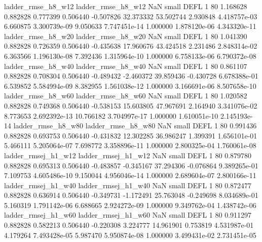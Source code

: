       ladder_rmse_h8_w12       ladder_rmse_h8_w12                   NaN      small     DEFL                 1 80 1.168628       0.882828 0.777399       0.506440   -0.507826     32.373332     53.502744     2.930848   4.418757e-03  6.660875 3.300739e-09     9.050633   7.747451e-14            1.000000    1.878120e-06        4.343320e-11
      ladder_rmse_h8_w20       ladder_rmse_h8_w20                   NaN      small     DEFL                 1 80 1.041390       0.882828 0.726359       0.506440   -0.435638     17.960676     43.424518     2.231486   2.848314e-02  6.363566 1.196130e-08     7.392436   1.315964e-10            1.000000    6.758133e-06        6.790372e-08
      ladder_rmse_h8_w40       ladder_rmse_h8_w40                   NaN      small     DEFL                 1 80 0.861107       0.882828 0.708304       0.506440   -0.489432     -2.460372     39.859436    -0.430728   6.678388e-01  6.539852 5.584994e-09     8.382955   1.561038e-12            1.000000    3.166691e-06        8.507658e-10
      ladder_rmse_h8_w60       ladder_rmse_h8_w60                   NaN      small     DEFL                 1 80 1.020582       0.882828 0.749368       0.506440   -0.538153     15.603805     47.967691     2.164940   3.341076e-02  8.773653 2.692392e-13    10.766182   3.704997e-17            1.000000    1.610051e-10        2.145193e-14
      ladder_rmse_h8_w80       ladder_rmse_h8_w80                   NaN      small     DEFL                 1 80 0.991436       0.882828 0.693753       0.506440   -0.431832     12.302285     36.986247     1.399391   1.656101e-01  5.466111 5.205064e-07     7.698772   3.358896e-11            1.000000    2.800325e-04        1.760061e-08
     ladder_rmsej_h1_w12      ladder_rmsej_h1_w12                   NaN      small     DEFL                 1 80 0.879780       0.882828 0.695313       0.506440   -0.483857     -0.345167     37.294306    -0.076864   9.389265e-01  7.109753 4.605486e-10     9.150044   4.956046e-14            1.000000    2.689604e-07        2.800166e-11
     ladder_rmsej_h1_w40      ladder_rmsej_h1_w40                   NaN      small     DEFL                 1 80 0.872477       0.882828 0.636914       0.506440   -0.349731     -1.172491     25.763048    -0.249698   8.034689e-01  5.160319 1.791142e-06     6.688665   2.924272e-09            1.000000    9.349762e-04        1.438742e-06
     ladder_rmsej_h1_w60      ladder_rmsej_h1_w60                   NaN      small     DEFL                 1 80 0.911297       0.882828 0.582213       0.506440   -0.220308      3.224777     14.961901     0.753819   4.531987e-01  4.179264 7.493428e-05     5.987470   5.950874e-08            1.000000    3.499431e-02        2.731451e-05
